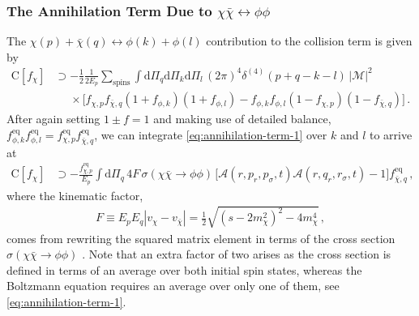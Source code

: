 \documentclass[
onecolumn, %
11pt, %
tightenlines,
superscriptaddress, %
nofootinbib, %
preprintnumbers, %
prd %
]{revtex4-1}
\newcommand{\upd}{\mathrm d}                                          %
\newcommand{\A}{\ensuremath{\mathcal A}\xspace}
\begin{document}
\subsubsection{The Annihilation Term Due to $\chi\bar\chi \leftrightarrow \phi\phi$}

The $\chi(p) + \bar\chi(q) \leftrightarrow \phi(k) + \phi(l)$ contribution to the collision term is given by~\cite{Gondolo:1990dk}
%
\begin{align}
    \boldsymbol{\mathrm C}[f_\chi] &\supset
      - \frac{1}{2}\frac{1}{2E_p} \sum_\text{spins} \int \upd\Pi_q \upd\Pi_k \upd\Pi_l \,
        (2\pi)^4 \delta^{(4)}(p+q-k-l) \, |\mathcal M|^2 \nonumber\\
    &\phantom{\supset} \times
        \Big[ f_{\chi,p} f_{\bar\chi,q} (1 + f_{\phi,k}) (1 + f_{\phi,l})
            - f_{\phi,k} f_{\phi,l} (1 - f_{\chi,p}) (1 - f_{\bar\chi,q}) \Big] \,.
    \label{eq:annihilation-term-1}
\end{align}
%
After again setting $1\pm f=1$ and making use of detailed balance, $f^\text{eq}_{\phi,k} f^\text{eq}_{\phi,l} = f^\text{eq}_{\chi,p} f^\text{eq}_{\bar\chi,q}$, we can integrate \cref{eq:annihilation-term-1} over $k$ and $l$ to arrive at
%
\begin{align}
    \boldsymbol{\mathrm C}[f_\chi] &\supset
      - \frac{f_{\chi,p}^\text{eq}}{E_p}
        \int \upd\Pi_q \, 4 F\, \sigma(\chi\bar\chi\to\phi\phi) \,
        \big[ \A(r, p_r, p_\sigma, t) \A(r, q_r, r_\sigma, t) - 1 \big] f_{\bar\chi,q}^\text{eq} \,,
    \label{eq:annihilation-term-2}
\end{align}
%
where the kinematic factor,
%
\begin{align}
    F \equiv E_p E_q |v_\chi - v_{\bar\chi}|
      =      \frac{1}{2} \sqrt{(s-2m_\chi^2)^2 - 4 m_\chi^4} \,,
\end{align}
%
comes from rewriting the squared matrix element in terms of the cross section $\sigma(\chi\bar\chi\to\phi\phi)$ \cite{Gondolo:1990dk}. Note that an extra factor of two arises as the cross section is defined in terms of an average over both initial spin states, whereas the Boltzmann equation requires an average over only one of them, see \cref{eq:annihilation-term-1}.
\end{document}
